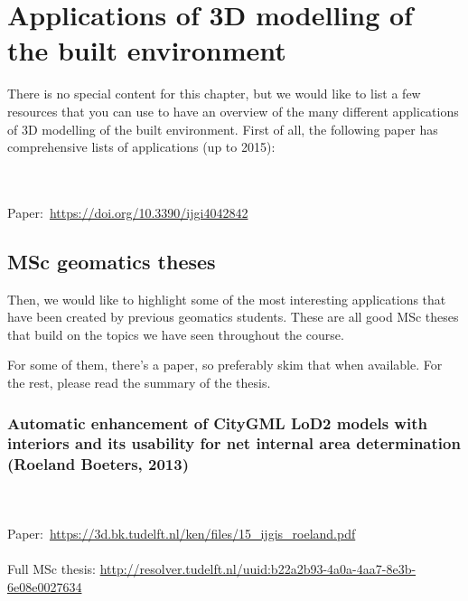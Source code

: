 
\setchapterpreamble[u]{\margintoc}

\graphicspath{{apps/}}

\chapter{Applications of 3D modelling of the built environment}%
\label{chap:apps}

There is no special content for this chapter, but we would like to list a few resources that you can use to have an overview of the many different applications of 3D modelling of the built environment.
First of all, the following paper has comprehensive lists of applications (up to 2015):

\begin{kaobox}[frametitle=\faExternalLink\ To read or to watch.]
\\ \\
Paper:\ \url{https://doi.org/10.3390/ijgi4042842}
\end{kaobox}

\section{MSc geomatics theses}

Then, we would like to highlight some of the most interesting applications that have been created by previous geomatics students.
These are all good MSc theses that build on the topics we have seen throughout the course.

For some of them, there's a paper, so preferably skim that when available.
For the rest, please read the summary of the thesis.

\subsection{Automatic enhancement of CityGML LoD2 models with interiors and its usability for net internal area determination (Roeland Boeters, 2013)}

\begin{kaobox}[frametitle=\faExternalLink\ To read or to watch.]
\\ \\
Paper:\ \url{https://3d.bk.tudelft.nl/ken/files/15_ijgis_roeland.pdf}
\\ \\
Full MSc thesis: \url{http://resolver.tudelft.nl/uuid:b22a2b93-4a0a-4aa7-8e3b-6e08e0027634}
\end{kaobox}

